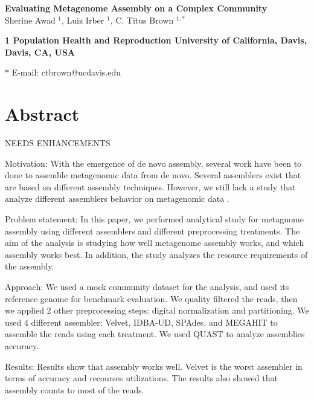 \pagestyle{myheadings}



 



\begin{flushleft}
{\Large
\textbf{Evaluating Metagenome Assembly on a Complex Community}
}
\\
 
Sherine Awad $^{1}$, 
Luiz Irber $^{1}$, 
C. Titus Brown $^{1,\ast}$ 

\bf{1} Population Health and Reproduction
University of California, Davis, Davis, CA, USA 
 
 
$\ast$ E-mail:  ctbrown@ucdavis.edu 
\end{flushleft}

\section*{Abstract}
NEEDS ENHANCEMENTS

Motivation: With the emergence of de novo assembly, several work have been to done to assemble metagenomic data from de novo. Several assemblers exist that are based on different assembly techniques. However, we still lack  a study that analyze different assemblers behavior on metagenomic data . 


Problem statement: In this paper, we performed analytical study for metagnome assembly using different assemblers and different preprocessing treatments. The aim of the analysis is studying how well metagenome assembly works, and which assembly works best. In addition, the study analyzes the resource requirements of the assembly. 


Approach: We used a mock community dataset for the analysis, and used its reference genome for benchmark evaluation. We quality filtered the reads, then we applied 2 other preprocessing steps: digital normalization and partitioning. We used 4 different assembler: Velvet, IDBA-UD, SPAdes, and MEGAHIT to assemble the reads using each treatment. We used QUAST to analyze assemblies accuracy. 

Results: Results show that assembly works well. Velvet is the worst assembler in terms of accuracy and recourses utilizations. The results also showed that assembly counts to most of the reads. 
 
